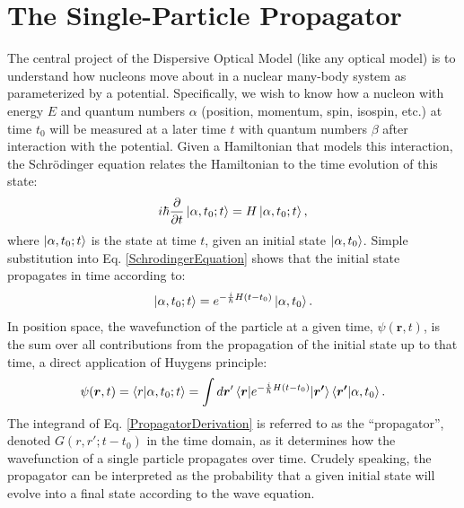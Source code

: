 \section{The Single-Particle Propagator}
The central project of the Dispersive Optical Model (like any optical model) is
to understand how nucleons move about in a nuclear many-body system as parameterized by a 
potential.
Specifically, we wish to know
how a nucleon with energy $E$ and quantum numbers $\alpha$
(position, momentum, spin, isospin, etc.) at time $t_{0}$ will be measured at a
later time $t$ with quantum numbers $\beta$ after interaction with the
potential. Given a
Hamiltonian that models this interaction, the Schr\"odinger equation
relates the Hamiltonian to the time evolution of this state:
\begin{equation} \label{SchrodingerEquation}
    i\hbar\frac{\partial}{\partial t}\ket{\alpha, t_{0}; t} = H\ket{\alpha,
    t_{0}; t},
\end{equation}
where $\ket{\alpha, t_{0}; t}$ is the state at time $t$, given an initial state
$\ket{\alpha, t_{0}}$. Simple substitution into Eq. \ref{SchrodingerEquation} shows
that the initial state propagates in time according to:
\begin{equation}
    \ket{\alpha, t_{0}; t} = e^{-\frac{i}{\hbar}H(t-t_{0})}\ket{\alpha, t_{0}}.
\end{equation}
In position space, the wavefunction of the particle at a given time, $\psi(\bm{r},t)$,
is the sum over all contributions from the propagation of the initial state up to that time,
a direct application of Huygens principle:
\begin{equation} \label{PropagatorDerivation}
    \begin{split}
        \psi(\bm{r},t) = \braket{r|\alpha, t_{0}; t}
        = \int d\bm{r}'
        \braket{\bm{r}|e^{-\frac{i}{\hbar}H(t-t_{0})}|\bm{r'}}\braket{\bm{r'}|\alpha,t_{0}}.
    \end{split}
\end{equation}
The integrand of Eq. \ref{PropagatorDerivation} is referred to as the
``\gls{propagator}'', 
denoted $G(r, r'; t-t_{0})$ in the time domain,
as it determines how the wavefunction of a single particle
propagates over time. Crudely speaking, the propagator can be interpreted as the
probability that a given
initial state will evolve into a final state according to the wave equation.

